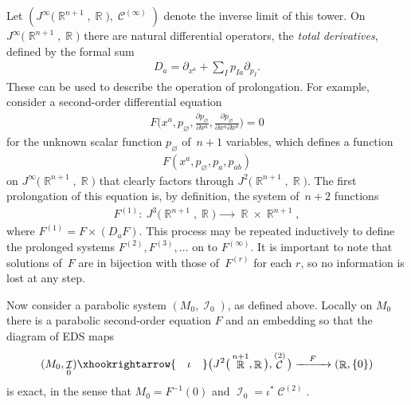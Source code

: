 \documentclass[pdftex]{sigma}
\DeclareMathOperator{\R}{\mathbb{R}}
\DeclareMathOperator{\I}{\mathcal{I}}
\DeclareMathOperator{\contact}{\mathcal{C}}
\newcommand{\pDeriv}[2]{\frac{\partial #1}{\partial #2}}
\newcommand{\jet}[1]{J^{#1}\big(\R^{n+1},\R\big)}
\numberwithin{equation}{section}
\begin{document}
Let $(\jet{\infty}, \contact^{(\infty)})$ denote the inverse limit of this tower. On $\jet{\infty}$ there are natural differential operators, the \emph{total derivatives}, defined by the formal sum
\begin{gather*}
D_a = \partial_{x^a} + \sum_I p_{Ia}\partial_{p_I} .
\end{gather*}
These can be used to describe the operation of prolongation. For example, consider a second-order differential equation
\begin{gather*}
F\bigg(x^a, p_\varnothing, \pDeriv{p_\varnothing}{x^a}, \pDeriv{p_\varnothing}{x^a \partial x^b}\bigg) = 0
\end{gather*}
for the unknown scalar function $p_\varnothing$ of~$n+1$ variables, which defines a function
\begin{gather*}
F(x^a, p_\varnothing, p_a, p_{ab})
\end{gather*}
on $\jet{\infty}$ that clearly factors through $\jet{2}$. The first prolongation of this equation is, by definition, the system of~$n+2$ functions
\begin{gather*}
F^{(1)} \colon\ \jet{3} \xrightarrow{\qquad} \R\times\R^{n+1} ,
\end{gather*}
where $F^{(1)} = F\times(D_a F)$.
This process may be repeated inductively to define the prolonged systems $F^{(2)}, F^{(3)}, \dots$ on to $F^{(\infty)}$. It is important to note that solutions of~$F$ are in bijection with those of~$F^{(r)}$ for each $r$, so no information is lost at any step.

 Now consider a parabolic system $(M_0, \I_0)$, as defined above. Locally on $M_0$ there is a parabolic second-order equation $F$ and an embedding so that the diagram of EDS maps
 \begin{gather*}
 (M_0, \I_0) \xhookrightarrow{\quad \iota \quad} \big(\jet{2}, \contact^{(2)}\big) \xrightarrow{\quad F \quad} (\R, \{0\})
 \end{gather*}
 is exact, in the sense that $M_0 = F^{-1}(0)$ and $\I_0 = \iota^*\contact^{(2)}$.
\end{document}

